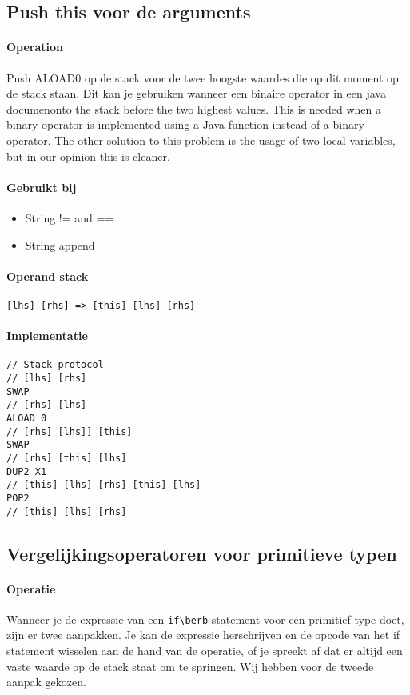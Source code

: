 \subsection{Push this voor de arguments}
\label{sec:push_this_before}

\paragraph{Operation}
Push ALOAD0 op de stack voor de twee hoogste waardes die op dit moment op de stack staan. Dit kan je gebruiken wanneer een binaire operator in een java documenonto the stack before the two highest values. This is needed when a binary operator is implemented using a Java function instead of a binary operator. The other solution to this problem is the usage of two local variables, but in our opinion this is cleaner.

\paragraph{Gebruikt bij}
\begin{itemize}
	\item{String != and ==}
	\item{String append}
\end{itemize}

\paragraph{Operand stack}
\verb+[lhs] [rhs] => [this] [lhs] [rhs]+

\paragraph{Implementatie}
\begin{verbatim}
// Stack protocol
// [lhs] [rhs]
SWAP
// [rhs] [lhs]
ALOAD 0
// [rhs] [lhs]] [this]
SWAP
// [rhs] [this] [lhs]
DUP2_X1
// [this] [lhs] [rhs] [this] [lhs]
POP2
// [this] [lhs] [rhs]
\end{verbatim}

\subsection{Vergelijkingsoperatoren voor primitieve typen}
\paragraph{Operatie}
Wanneer je de expressie van een \verb+if\berb+ statement voor een primitief type doet, zijn er twee aanpakken. Je kan de expressie herschrijven en de opcode van het if statement wisselen aan de hand van de operatie, of je spreekt af dat er altijd een vaste waarde op de stack staat om te springen.
Wij hebben voor de tweede aanpak gekozen.

